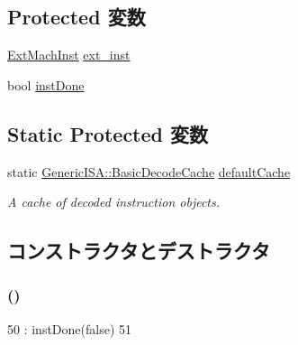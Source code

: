 \subsection*{Protected 変数}
\begin{DoxyCompactItemize}
\item 
\hyperlink{namespaceAlphaISA_aec686c38e40c7f794f1435591c15c275}{ExtMachInst} \hyperlink{classAlphaISA_1_1Decoder_a45b15fdde7b9f97351b37a784e76fcb2}{ext\_\-inst}
\item 
bool \hyperlink{classAlphaISA_1_1Decoder_a37c5d55785204b8fd00a8ebf62e1fc33}{instDone}
\end{DoxyCompactItemize}
\subsection*{Static Protected 変数}
\begin{DoxyCompactItemize}
\item 
static \hyperlink{classGenericISA_1_1BasicDecodeCache}{GenericISA::BasicDecodeCache} \hyperlink{classAlphaISA_1_1Decoder_a8800313f93afe356e1177866068cc8d6}{defaultCache}
\begin{DoxyCompactList}\small\item\em A cache of decoded instruction objects. \item\end{DoxyCompactList}\end{DoxyCompactItemize}


\subsection{コンストラクタとデストラクタ}
\hypertarget{classAlphaISA_1_1Decoder_aedfa2b7d97ed17b14903ed75d6214c78}{
\subsubsection[{Decoder}]{ ()}}
\label{classAlphaISA_1_1Decoder_aedfa2b7d97ed17b14903ed75d6214c78}



\begin{DoxyCode}
50               : instDone(false)
51     {}
\end{DoxyCode}


